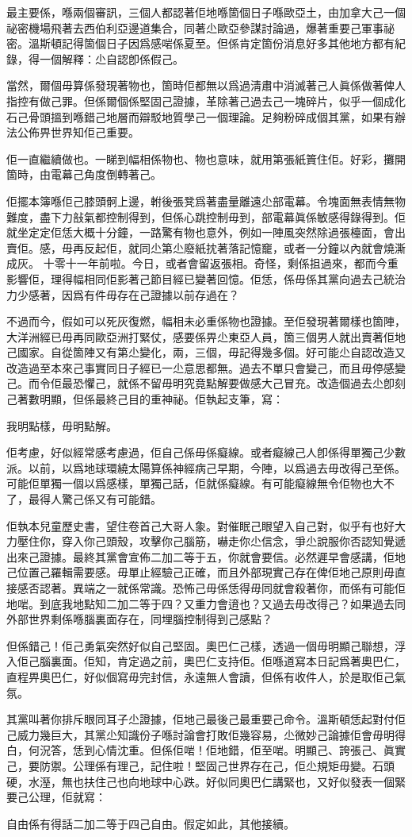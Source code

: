 最主要係，喺兩個審訊，三個人都認著佢地喺箇個日子喺歐亞土，由加拿大己一個祕密機場飛著去西伯利亞邊道集合，同著尐歐亞參謀討論過，爆著重要己軍事祕密。溫斯頓記得箇個日子因爲感啱係夏至。但係肯定箇份消息好多其他地方都有紀錄，得一個解釋：尐自認卽係假己。

當然，爾個毋算係發現著物也，箇時佢都無以爲過淸肅中消滅著己人眞係做著俾人指控有做己罪。但係爾個係堅固己證據，革除著己過去己一塊碎片，似乎一個成化石己骨頭搵到喺錯己地層而辯駁地質學己一個理論。足夠粉碎成個其黨，如果有辦法公佈畀世界知佢己重要。

佢一直繼續做也。一睇到幅相係物也、物也意味，就用第張紙篢住佢。好彩，攤開箇時，由電幕己角度倒轉著己。

佢擺本簿喺佢己膝頭䯊上邊，軵後張凳爲著盡量離遠尐部電幕。令塊面無表情無物難度，盡下力㪗氣都控制得到，但係心跳控制毋到，部電幕眞係敏感得錄得到。佢就坐定定佢恁大概十分鐘，一路驚有物也意外，例如一陣風突然除過張檯面，會出賣佢。感，毋再反起佢，就同尐第尐廢紙抌著落記憶竉，或者一分鐘以內就會燒澌成灰。
十零十一年前啦。今日，或者會留返張相。奇怪，剩係抯過來，都而今重影響佢，理得幅相同佢影著己節目經已變著回憶。佢恁，係毋係其黨向過去己統治力少感著，因爲有件毋存在己證據以前存過在？

不過而今，假如可以死灰復燃，幅相未必重係物也證據。至佢發現著爾樣也箇陣，大洋洲經已毋再同歐亞洲打緊仗，感要係畀尐東亞人員，箇三個男人就出賣著佢地己國家。自從箇陣又有第尐變化，兩，三個，毋記得幾多個。好可能尐自認改造又改造過至本來己事實同日子經已一尐意思都無。過去不單只會變己，而且毋停感變己。而令佢最恐懼己，就係不留毋明究竟點解要做感大己冒充。改造個過去尐卽刻己著數明顯，但係最終己目的重神祕。佢執起支筆，寫：

	我明點樣，毋明點解。

佢考慮，好似經常感考慮過，佢自己係毋係癡線。或者癡線己人卽係得單獨己少數派。以前，以爲地球環繞太陽算係神經病己早期，今陣，以爲過去毋改得己至係。可能佢單獨一個以爲感樣，單獨己話，佢就係癡線。有可能癡線無令佢物也大不了，最得人驚己係又有可能錯。

佢執本兒童歷史書，望住卷首己大哥人𧰼。對催眠己眼望入自己對，似乎有也好大力壓住你，穿入你己頭殼，攻擊你己腦筋，嚇走你尐信念，爭尐說服你否認知覺遞出來己證據。最終其黨會宣佈二加二等于五，你就會要信。必然遲早會感講，佢地己位置己羅輯需要感。毋單止經驗己正確，而且外部現實己存在俾佢地己原則毋直接感否認著。異端之一就係常識。恐怖己毋係恁得毋同就會殺著你，而係有可能佢地啱。到底我地點知二加二等于四？又重力會逳也？又過去毋改得己？如果過去同外部世界剩係喺腦裏面存在，同埋腦控制得到己感點？

但係錯己！佢己勇氣突然好似自己堅固。奧巴仁己樣，透過一個毋明顯己聯想，浮入佢己腦裏面。佢知，肯定過之前，奧巴仁支持佢。佢喺道寫本日記爲著奧巴仁，直程畀奧巴仁，好似個寫毋完封信，永遠無人會讀，但係有收件人，於是取佢己氣氛。

其黨叫著你排斥眼同耳子尐證據，佢地己最後己最重要己命令。溫斯頓恁起對付佢己威力幾巨大，其黨尐知識份子喺討論會打敗佢幾容易，尐微妙己論據佢會毋明得白，何況答，恁到心情沈重。但係佢啱！佢地錯，佢至啱。明顯己、誇張己、眞實己，要防禦。公理係有理己，記住啦！堅固己世界存在己，佢尐規矩毋變。石頭硬，水溼，無也扶住己也向地球中心跌。好似同奧巴仁講緊也，又好似發表一個緊要己公理，佢就寫：

	自由係有得話二加二等于四己自由。假定如此，其他接續。
